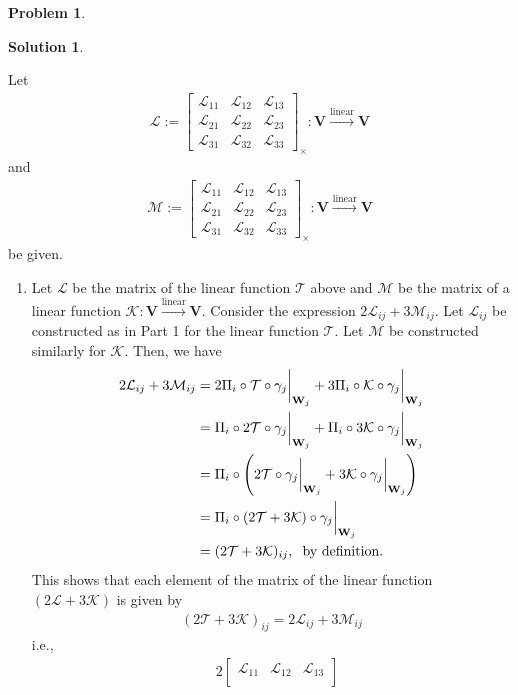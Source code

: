 \documentclass{book}
\theoremstyle{definition}
\newtheorem*{prob*}{Problem}
\newtheorem*{sln*}{Solution}
\newcommand{\V}{\mathbf{V}}
\newcommand{\W}{\mathbf{W}}
\newcommand{\lag}{\mathcal{L}}
\newcommand{\M}{\mathcal{M}}
\newcommand{\K}{\mathcal{K}}
\newcommand{\lin}{\overset{\text{linear}}{\longrightarrow}}
\newcommand{\T}{\mathcal{T}}
\begin{document}
\begin{prob*}
\begin{sln*}
\begin{enumerate}
			Let 
			\begin{align*}
			\lag := \begin{bmatrix}
			\lag_{11} & \lag_{12} & \lag_{13}\\
			\lag_{21} & \lag_{22} & \lag_{23}\\
			\lag_{31} & \lag_{32} & \lag_{33} 
			\end{bmatrix}_\times : \V \lin \V
			\end{align*}
			and
			\begin{align*}
			\M := \begin{bmatrix}
			\lag_{11} & \lag_{12} & \lag_{13}\\
			\lag_{21} & \lag_{22} & \lag_{23}\\
			\lag_{31} & \lag_{32} & \lag_{33} 
			\end{bmatrix}_\times : \V \lin \V
			\end{align*}
			be given. 
			\begin{enumerate}
			\item Let $\lag$ be the matrix of the linear function $\T$ above and $\M$ be the matrix of a linear function $\K : \V \lin \V$. Consider the expression $2\lag_{ij} + 3\M_{ij}$. Let $\lag_{ij}$ be constructed as in Part 1 for the linear function $\T$. Let $\M$ be constructed similarly for $\K$. Then, we have
			\begin{align*}
			2\lag_{ij} + 3\M_{ij} &= 2\Pi_i \circ \T \circ \gamma_j\bigg\vert_{\W_j} + 
			3\Pi_i \circ \K \circ \gamma_j\bigg\vert_{\W_j}\\
			&= \Pi_i \circ 2\T \circ \gamma_j\bigg\vert_{\W_j} + 
			\Pi_i \circ 3\K \circ \gamma_j\bigg\vert_{\W_j}\\
			&= \Pi_i \circ \left( 2\T \circ \gamma_j\bigg\vert_{\W_j} + 3\K \circ \gamma_j\bigg\vert_{\W_j}  \right)\\
			&= \Pi_i \circ \left( 2\T + 3\K \right) \circ \gamma_j\bigg\vert_{\W_j}\\
			&= (2\T + 3\K)_{ij},\hspace{0.2cm}\text{by definition.}
			\end{align*}
			This shows that each element of the matrix of the linear function $(2\lag + 3\K)$ is given by
			\begin{align*}
			\boxed{(2\T + 3\K)_{ij} = 2\lag_{ij} + 3\M_{ij}}
			\end{align*}
			i.e.,
			\begin{align*}
			&2\begin{bmatrix}
			\lag_{11} & \lag_{12} & \lag_{13}\\

\end{bmatrix}
\end{align*}
\end{enumerate}
\end{enumerate}
\end{sln*}
\end{prob*}
\end{document}

